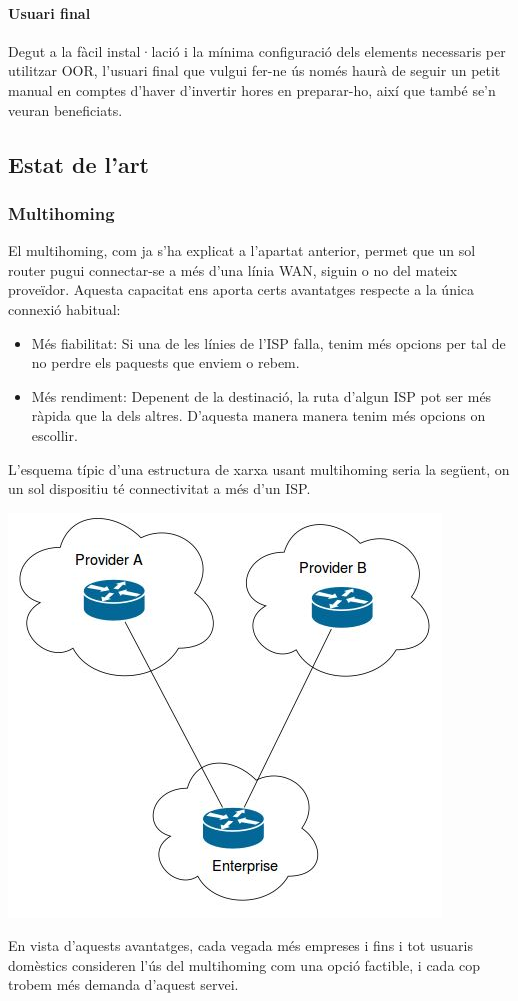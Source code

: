 \documentclass[11pt]{article}
\begin{document}
\paragraph{Usuari final}
Degut a la fàcil instal·lació i la mínima configuració dels elements necessaris per utilitzar OOR, l’usuari final que vulgui fer-ne ús només haurà de seguir un petit manual en comptes d’haver d’invertir hores en preparar-ho, així que també se’n veuran beneficiats.

\subsection{Estat de l'art}
\subsubsection{Multihoming}
El multihoming, com ja s’ha explicat a l’apartat anterior, permet que un sol router pugui connectar-se a més d’una línia WAN, siguin o no del mateix proveïdor. Aquesta capacitat ens aporta certs avantatges respecte a la única connexió habitual:
\begin{itemize}
\item Més fiabilitat: Si una de les línies de l’ISP falla, tenim més opcions per tal de no perdre els paquests que enviem o rebem.
\item Més rendiment: Depenent de la destinació, la ruta d’algun ISP pot ser més ràpida que la dels altres. D’aquesta manera manera tenim més opcions on escollir. 
\end{itemize}
L’esquema típic d’una estructura de xarxa usant multihoming seria la següent, on un sol dispositiu té connectivitat a més d’un ISP.
\begin{center}
\includegraphics{multihoming}
\end{center}
En vista d'aquests avantatges, cada vegada més empreses i fins i tot usuaris domèstics consideren l'ús del multihoming com una opció factible, i cada cop trobem més demanda d'aquest servei.
\end{document}
